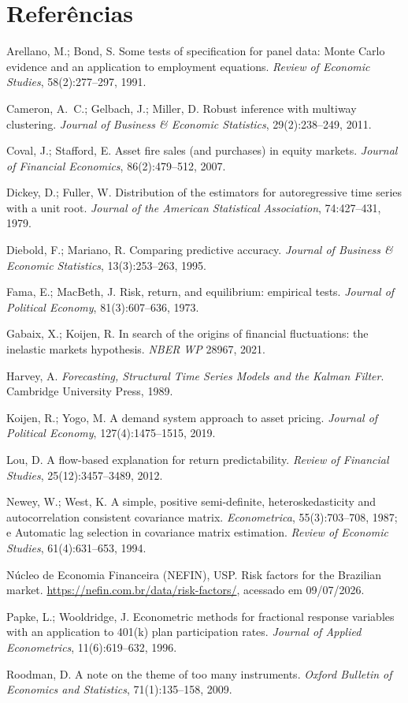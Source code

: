\documentclass[11pt,a4paper]{article}
\begin{document}
\section{Referências}
\small
\begin{description}[topsep=2pt,itemsep=1pt]
\item Arellano, M.; Bond, S. Some tests of specification for panel data: Monte Carlo evidence and
an application to employment equations. \emph{Review of Economic Studies}, 58(2):277--297, 1991.
\item Cameron, A.\ C.; Gelbach, J.; Miller, D. Robust inference with multiway clustering.
\emph{Journal of Business \& Economic Statistics}, 29(2):238--249, 2011.
\item Coval, J.; Stafford, E. Asset fire sales (and purchases) in equity markets.
\emph{Journal of Financial Economics}, 86(2):479--512, 2007.
\item Dickey, D.; Fuller, W. Distribution of the estimators for autoregressive time series with a
unit root. \emph{Journal of the American Statistical Association}, 74:427--431, 1979.
\item Diebold, F.; Mariano, R. Comparing predictive accuracy. \emph{Journal of Business \&
Economic Statistics}, 13(3):253--263, 1995.
\item Fama, E.; MacBeth, J. Risk, return, and equilibrium: empirical tests. \emph{Journal of
Political Economy}, 81(3):607--636, 1973.
\item Gabaix, X.; Koijen, R. In search of the origins of financial fluctuations: the inelastic
markets hypothesis. \emph{NBER WP} 28967, 2021.
\item Harvey, A. \emph{Forecasting, Structural Time Series Models and the Kalman Filter}.
Cambridge University Press, 1989.
\item Koijen, R.; Yogo, M. A demand system approach to asset pricing. \emph{Journal of Political
Economy}, 127(4):1475--1515, 2019.
\item Lou, D. A flow-based explanation for return predictability. \emph{Review of Financial
Studies}, 25(12):3457--3489, 2012.
\item Newey, W.; West, K. A simple, positive semi-definite, heteroskedasticity and autocorrelation
consistent covariance matrix. \emph{Econometrica}, 55(3):703--708, 1987; e Automatic lag selection
in covariance matrix estimation. \emph{Review of Economic Studies}, 61(4):631--653, 1994.
\item Núcleo de Economia Financeira (NEFIN), USP. Risk factors for the Brazilian market.
\url{https://nefin.com.br/data/risk-factors/}, acessado em 09/07/2026.
\item Papke, L.; Wooldridge, J. Econometric methods for fractional response variables with an
application to 401(k) plan participation rates. \emph{Journal of Applied Econometrics},
11(6):619--632, 1996.
\item Roodman, D. A note on the theme of too many instruments. \emph{Oxford Bulletin of
Economics and Statistics}, 71(1):135--158, 2009.
\end{description}
\end{document}
